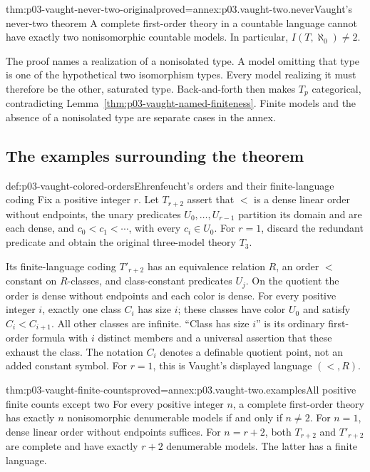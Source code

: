 \begin{hbtheorem}{thm:p03-vaught-never-two-original}{proved=annex:p03.vaught-two.never}{Vaught's never-two theorem}
A complete first-order theory in a countable language cannot have exactly
two nonisomorphic countable models. In particular,
\(I(T,\aleph_0)\ne2\).
\end{hbtheorem}

The proof names a realization of a nonisolated type. A model omitting that
type is one of the hypothetical two isomorphism types. Every model realizing
it must therefore be the other, saturated type. Back-and-forth then makes
\(T_p\) categorical, contradicting
Lemma~\ref{thm:p03-vaught-named-finiteness}. Finite models and the absence
of a nonisolated type are separate cases in the annex.

\subsection{The examples surrounding the theorem}
\label{sec:p03-vaught-finite-count-examples}

\begin{hbdefinition}{def:p03-vaught-colored-orders}{Ehrenfeucht's orders and their finite-language coding}
Fix a positive integer \(r\). Let \(T_{r+2}\) assert that \(<\) is a dense
linear order without endpoints, the unary predicates
\(U_0,\ldots,U_{r-1}\) partition its domain and are each dense, and
\(c_0<c_1<\cdots\), with every \(c_i\in U_0\).
For \(r=1\), discard the redundant predicate and obtain the original
three-model theory \(T_3\).

Its finite-language coding \(T'_{r+2}\) has an equivalence relation \(R\),
an order \(<\) constant on \(R\)-classes, and class-constant predicates
\(U_j\). On the quotient the order is dense without endpoints and each
color is dense. For every positive integer \(i\), exactly one class
\(C_i\) has size \(i\); these classes have color \(U_0\) and satisfy
\(C_i<C_{i+1}\). All other classes are infinite. ``Class has size \(i\)''
is its ordinary first-order formula with \(i\) distinct members and a
universal assertion that these exhaust the class. The notation \(C_i\)
denotes a definable quotient point, not an added constant symbol.
For \(r=1\), this is Vaught's displayed language \((<,R)\).
\end{hbdefinition}

\begin{hbtheorem}{thm:p03-vaught-finite-counts}{proved=annex:p03.vaught-two.examples}{All positive finite counts except two}
For every positive integer \(n\), a complete first-order theory has exactly
\(n\) nonisomorphic denumerable models if and only if \(n\ne2\).
For \(n=1\), dense linear order without endpoints suffices. For \(n=r+2\),
both \(T_{r+2}\) and \(T'_{r+2}\) are complete and have exactly \(r+2\)
denumerable models. The latter has a finite language.
\end{hbtheorem}

